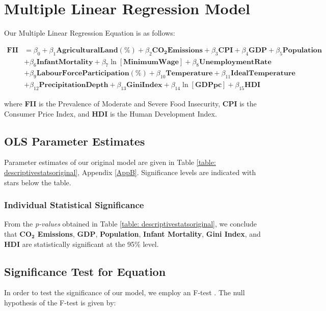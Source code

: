 \documentclass{article}
\begin{document}
\section{Multiple Linear Regression Model}

Our Multiple Linear Regression Equation is as follows: 

\begin{equation}
    \begin{aligned}
        \mathbf{FII} &= \beta_0 + \beta_1\mathbf{AgriculturalLand(\%)} + \beta_2\mathbf{CO_2Emissions} + \beta_3\mathbf{CPI} + \beta_4\mathbf{GDP} + \beta_5\mathbf{Population} \\ & + \beta_6\mathbf{InfantMortality} + \beta_7\ln{[\mathbf{MinimumWage}]} + \beta_8\mathbf{UnemploymentRate} \\ & + \beta_9\mathbf{LabourForceParticipation(\%)} + \beta_{10}\mathbf{Temperature} + \beta_{11}\mathbf{IdealTemperature} \\ & + \beta_{12}\mathbf{PrecipitationDepth} + \beta_{13}\mathbf{GiniIndex} + \beta_{14}\ln{[\mathbf{GDPpc}]} + \beta_{15}\mathbf{HDI}
    \end{aligned}
\end{equation}

\noindent where \textbf{FII} is the Prevalence of Moderate and Severe Food Insecurity, \textbf{CPI} is the Consumer Price Index, and \textbf{HDI} is the Human Development Index.

\subsection{OLS Parameter Estimates}
Parameter estimates of our original model are given in Table \ref{table: descriptivestatsoriginal}, Appendix \ref{AppB}. Significance levels are indicated with stars below the table. 

\subsubsection{Individual Statistical Significance}\label{IndividualSignificance}
From the \textit{p-values} obtained in Table \ref{table: descriptivestatsoriginal}, we conclude that \textbf{$\bm{\text{CO}_2}$ Emissions}, \textbf{GDP}, \textbf{Population}, \textbf{Infant Mortality}, \textbf{Gini Index}, and \textbf{HDI} are statistically significant at the 95\% level. 

\subsection{Significance Test for Equation}\label{sec:sigtest}
In order to test the significance of our model, we employ an F-test \cite{Greene2003Econometric}. The null hypothesis of the F-test is given by:
\end{document}

